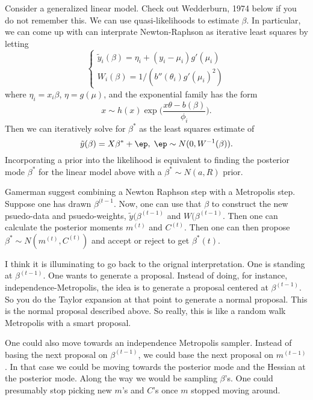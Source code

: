 \documentclass{article}
\begin{document}
Consider a generalized linear model.  Check out Wedderburn, 1974 below if you do
not remember this.  We can use quasi-likelihoods to estimate $\beta$.  In
particular, we can come up with can interprate Newton-Raphson as iterative least
squares by letting
\[
\begin{cases}
\tilde y_i(\beta) = \eta_i + (y_i - \mu_i) g'(\mu_i) \\
W_i(\beta) = 1 / (b''(\theta_i) g'(\mu_i)^2)
\end{cases}
\]
where $\eta_i = x_i \beta$, $\eta = g(\mu)$, and the exponential family has the
form
\[
x \sim h(x) \exp \Big( \frac{x \theta - b(\beta)}{\phi_i} \Big).
\]
Then we can iteratively solve for $\beta^*$ as the least squares estimate of
\[
\tilde y(\beta) = X \beta^* + \ep, \; \ep \sim N(0, W^{-1}(\beta)).
\]
Incorporating a prior into the likelihood is equivalent to finding the posterior
mode $\beta^*$ for the linear model above with a $\beta^* \sim N(a, R)$ prior.

Gamerman suggest combining a Newton Raphson step with a Metropolis step. Suppose
one has drawn $\beta^{(t-1}$.  Now, one can use that $\beta$ to construct the
new psuedo-data and psuedo-weights, $\tilde y(\beta^{(t-1)}$ and
$W(\beta^{(t-1)}$.  Then one can calculate the posterior moments $m^{(t)}$ and
$C^{(t)}$.  Then one can then propose $\beta^* \sim N(m^{(t)}, C^{(t)})$ and
accept or reject to get $\beta^*{(t)}$.

I think it is illuminating to go back to the orignal interpretation.  One is
standing at $\beta^{(t-1)}$.  One wants to generate a proposal.  Instead of
doing, for instance, independence-Metropolis, the idea is to generate a proposal
centered at $\beta^{(t-1)}$.  So you do the Taylor expansion at that point to
generate a normal proposal.  This is the normal proposal described above.  So
really, this is like a random walk Metropolis with a smart proposal.

One could also move towards an independence Metropolis sampler.  Instead of
basing the next proposal on $\beta^{(t-1)}$, we could base the next proposal on
$m^{(t-1)}$.  In that case we could be moving towards the posterior mode and the
Hessian at the posterior mode.  Along the way we would be sampling $\beta$'s.
One could presumably stop picking new $m$'s and $C$'s once $m$ stopped moving
around.
\end{document}
